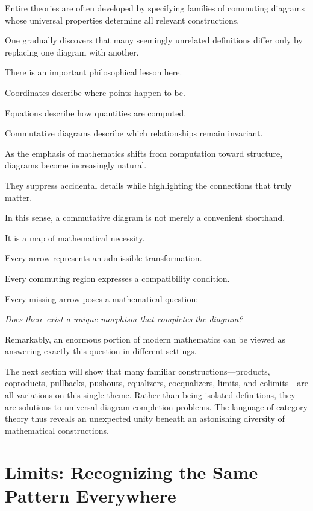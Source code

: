 \documentclass[11pt]{book}
\numberwithin{equation}{chapter}
\theoremstyle{definition}
\theoremstyle{plain}
\theoremstyle{remark}
\begin{document}
Entire theories are often developed by specifying families of commuting diagrams whose universal properties determine all relevant constructions.

One gradually discovers that many seemingly unrelated definitions differ only by replacing one diagram with another.

There is an important philosophical lesson here.

Coordinates describe where points happen to be.

Equations describe how quantities are computed.

Commutative diagrams describe which relationships remain invariant.

As the emphasis of mathematics shifts from computation toward structure, diagrams become increasingly natural.

They suppress accidental details while highlighting the connections that truly matter.

In this sense, a commutative diagram is not merely a convenient shorthand.

It is a map of mathematical necessity.

Every arrow represents an admissible transformation.

Every commuting region expresses a compatibility condition.

Every missing arrow poses a mathematical question:

\emph{Does there exist a unique morphism that completes the diagram?}

Remarkably, an enormous portion of modern mathematics can be viewed as answering exactly this question in different settings.

The next section will show that many familiar constructions—products, coproducts, pullbacks, pushouts, equalizers, coequalizers, limits, and colimits—are all variations on this single theme. Rather than being isolated definitions, they are solutions to universal diagram-completion problems. The language of category theory thus reveals an unexpected unity beneath an astonishing diversity of mathematical constructions.


\section{Limits: Recognizing the Same Pattern Everywhere}
\end{document}
